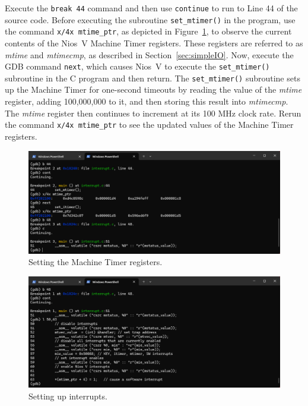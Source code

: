\documentclass[11pt, twoside, pdftex]{article}
\begin{document}
Execute the \texttt{break 44} command and then use \texttt{continue} to run to Line 44 of the 
source code. Before executing the subroutine \texttt{set\_mtimer()} in the program, use the
command \texttt{x/4x mtime\_ptr}, as depicted in Figure~\ref{fig:interrupt_C2}, to observe the
current contents of the Nios~V Machine Timer registers. These registers are referred to as
{\it mtime} and {\it mtimecmp}, as described in Section~\ref{sec:simpleIO}. Now, execute the
GDB command \texttt{next}, which causes Nios~V to execute the \texttt{set\_mtimer()} subroutine
in the C program and then return. The \texttt{set\_mtimer()} subroutine sets up the
Machine Timer for one-second timeouts by reading the value of the {\it mtime} register, 
adding 100,000,000 to it, and then storing this result into {\it mtimecmp}. The
{\it mtime} register then continues to increment at its 100 MHz clock rate. Rerun the 
command \texttt{x/4x mtime\_ptr} to see the updated values of the Machine Timer registers. 

\begin{figure}[h]
    \begin{center}
        \includegraphics[scale=.6]{figures/interrupt_C2.png}
        \caption{Setting the Machine Timer registers.}
        \label{fig:interrupt_C2}
    \end{center}
\end{figure}

\begin{figure}[h]
    \begin{center}
        \includegraphics[scale=.6]{figures/interrupt_C3.png}
        \caption{Setting up interrupts.}
        \label{fig:interrupt_C3}
    \end{center}
\end{figure}
\end{document}
